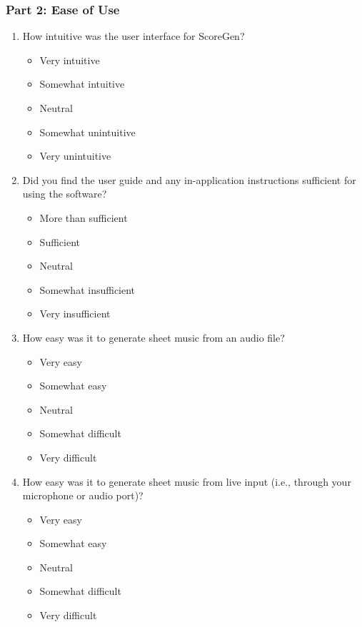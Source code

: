 \documentclass[12pt, titlepage]{article}
\begin{document}
\subsubsection*{Part 2: Ease of Use}
\begin{enumerate}[resume, leftmargin=*]
  \item How intuitive was the user interface for ScoreGen?
  \begin{itemize}
    \item Very intuitive
    \item Somewhat intuitive
    \item Neutral
    \item Somewhat unintuitive
    \item Very unintuitive
  \end{itemize}
  \item Did you find the user guide and any in-application instructions sufficient for using the software?
  \begin{itemize}
    \item More than sufficient
    \item Sufficient
    \item Neutral 
    \item Somewhat insufficient
    \item Very insufficient
  \end{itemize}
  \item How easy was it to generate sheet music from an audio file?
  \begin{itemize}
    \item Very easy
    \item Somewhat easy
    \item Neutral 
    \item Somewhat difficult
    \item Very difficult
  \end{itemize}
  \item How easy was it to generate sheet music from live input (i.e., through your microphone or audio port)?
  \begin{itemize}
    \item Very easy
    \item Somewhat easy
    \item Neutral 
    \item Somewhat difficult
    \item Very difficult
  \end{itemize}
\end{enumerate}
\end{document}

